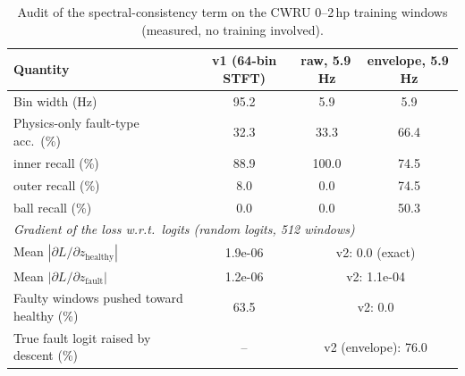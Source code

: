 \begin{table}[t]
\caption{Audit of the spectral-consistency term on the CWRU 0--2\,hp training windows (measured, no training involved).}
\label{tab:audit}
\centering
\footnotesize
\begin{tabular}{lccc}
\toprule
Quantity & v1 (64-bin STFT) & raw, 5.9\,Hz & envelope, 5.9\,Hz \\
\midrule
Bin width (Hz) & 95.2 & 5.9 & 5.9 \\
Physics-only fault-type acc.\ (\%) & 32.3 & 33.3 & 66.4 \\
\quad inner recall (\%) & 88.9 & 100.0 & 74.5 \\
\quad outer recall (\%) & 8.0 & 0.0 & 74.5 \\
\quad ball recall (\%) & 0.0 & 0.0 & 50.3 \\
\midrule
\multicolumn{4}{l}{\emph{Gradient of the loss w.r.t.\ logits (random logits, 512 windows)}} \\
Mean $|\partial L/\partial z_{\mathrm{healthy}}|$ & 1.9e-06 & \multicolumn{2}{c}{v2: 0.0 (exact)} \\
Mean $|\partial L/\partial z_{\mathrm{fault}}|$ & 1.2e-06 & \multicolumn{2}{c}{v2: 1.1e-04} \\
Faulty windows pushed toward healthy (\%) & 63.5 & \multicolumn{2}{c}{v2: 0.0} \\
True fault logit raised by descent (\%) & -- & \multicolumn{2}{c}{v2 (envelope): 76.0} \\
\bottomrule
\end{tabular}
\end{table}
